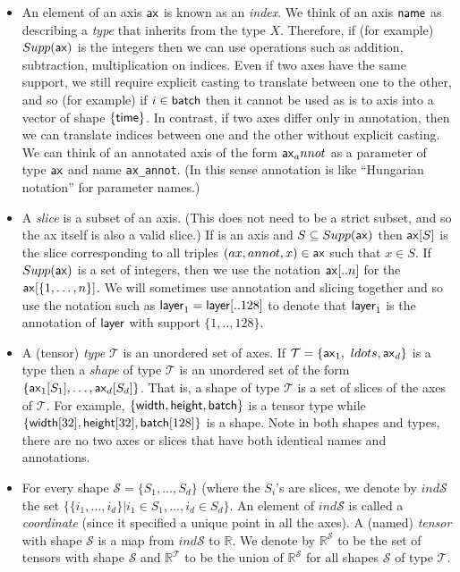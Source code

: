 \documentclass{article}
\begin{document}
\begin{itemize}
  \item An element of an axis $\mathsf{ax}$ is known as an \emph{index}. We think of an axis $\mathsf{name}$ as describing a \emph{type} that inherits from the type $X$. Therefore, if (for example) $Supp(\mathsf{ax})$ is the integers then we can use operations such as addition, subtraction, multiplication on indices.  Even if two axes have the same support, we still require explicit casting to translate between one to the other, and so (for example) if $i \in \mathsf{batch}$ then it cannot be used as is to axis into a vector of shape $\{ \mathsf{time} \}$. In contrast, if two axes differ only in annotation, then we can translate indices between one and the other without explicit casting. We can think of an annotated axis of the form $\mathsf{ax}_annot$ as a parameter of type $\mathsf{ax}$ and name \texttt{ax\_annot}. (In this sense annotation is like ``Hungarian notation'' for parameter names.) 


  
  \item A \emph{slice} is a subset of an axis. (This does not need to be a strict subset, and so the ax itself is also a valid slice.)  If  is an axis and $S \subseteq Supp(\mathsf{ax})$ then  $\mathsf{ax}[S]$ is the slice corresponding to all triples $(ax,annot,x) \in \mathsf{ax}$ such that $x\in S$.  If $Supp(\mathsf{ax})$ is a set of integers, then we use the notation $\mathsf{ax}[..n]$ for the $\mathsf{ax}[\{1,\ldots, n \}]$. We will sometimes use annotation and slicing together and so use the notation such as $\mathsf{layer}_1 = \mathsf{layer}[..128]$ to denote that $\mathsf{layer}_1$ is the annotation of $\mathsf{layer}$ with support $\{1,..,128 \}$.  
   
  \item A (tensor) \emph{type} $\mathcal{T}$ is an unordered set of axes. If $\mathcal{T} = \{ \mathsf{ax}_1 ,\ ldots, \mathsf{ax}_d \}$ is a type then a \emph{shape} of type $\mathcal{T}$ is an unordered set of the form $\{ \mathsf{ax}_1[S_1] ,\ldots, \mathsf{ax}_d[S_d] \}$. That is, a shape of type $\mathcal{T}$ is a set of slices of the axes of $\mathcal{T}$. For example, $\{ \mathsf{width} , \mathsf{height}, \mathsf{batch} \}$ is a tensor type while $\{ \mathsf{width}[32], \mathsf{height}[32], \mathsf{batch}[128] \}$ is a shape. Note in both shapes and types, there are no two axes or slices that have both identical names and annotations.

  \item For every shape $\mathcal{S} = \{ S_1,\ldots, S_d \}$ (where the $S_i$'s are slices, we denote by $ind \mathcal{S}$ the set $\{ \{ i_1,\ldots, i_d \} | i_1 \in S_1, \ldots, i_d \in S_d \}$. An element of $ind \mathcal{S}$ is called a \emph{coordinate} (since it specified a unique point in all the axes). A (named) \emph{tensor} with shape $\mathcal{S}$ is a map from $ind \mathcal{S}$ to $\mathbb{R}$. We denote by $\mathbb{R}^{\mathcal{S}}$ to be the set of tensors with shape $\mathcal{S}$ and $\mathbb{R}^{\mathcal{T}}$ to be the union of $\mathbb{R}^{\mathcal{S}}$ for all shapes $\mathcal{S}$ of type $\mathcal{T}$.
  

\end{itemize}
\end{document}
